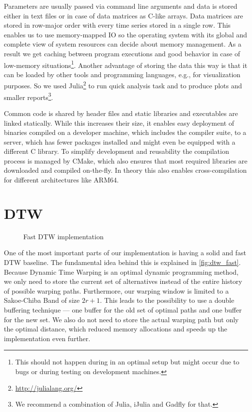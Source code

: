 Parameters are usually passed via command line arguments and data is stored either in text files or in case of data matrices as C-like arrays. Data matrices are stored in row-major order with every time series stored in a single row. This enables us to use memory-mapped IO so the operating system with its global and complete view of system resources can decide about memory management. As a result we get caching between program executions and good behavior in case of low-memory situations\footnote{This should not happen during in an optimal setup but might occur due to bugs or during testing on development machines.}. Another advantage of storing the data this way is that it can be loaded by other tools and programming languages, e.g., for visualization purposes. So we used Julia\footnote{\url{http://julialang.org/}} to run quick analysis task and to produce plots and smaller reports\footnote{We recommend a combination of Julia, iJulia and Gadfly for that.}.

Common code is shared by header files and static libraries and executables are linked statically. While this increases their size, it enables easy deployment of binaries compiled on a developer machine, which includes the compiler suite, to a server, which has fewer packages installed and might even be equipped with a different C library. To simplify development and reusability the compilation process is managed by CMake, which also ensures that most required libraries are downloaded and compiled on-the-fly. In theory this also enables cross-compilation for different architectures like ARM64.



\section{DTW}
\label{sec:implementation:dtw}

\begin{figure}
    \centering
    
    \caption{Fast DTW implementation}\label{fig:dtw_fast}
\end{figure}

One of the most important parts of our implementation is having a solid and fast DTW baseline. The fundamental idea behind this is explained in \autoref{fig:dtw_fast}. Because Dynamic Time Warping is an optimal dynamic programming method, we only need to store the current set of alternatives instead of the entire history of possible warping paths. Furthermore, our warping window is limited to a Sakoe-Chiba Band of size $2r + 1$. This leads to the possibility to use a double buffering technique --- one buffer for the old set of optimal paths and one buffer for the new set. We also do not need to store the actual warping path but only the optimal distance, which reduced memory allocations and speeds up the implementation even further.

